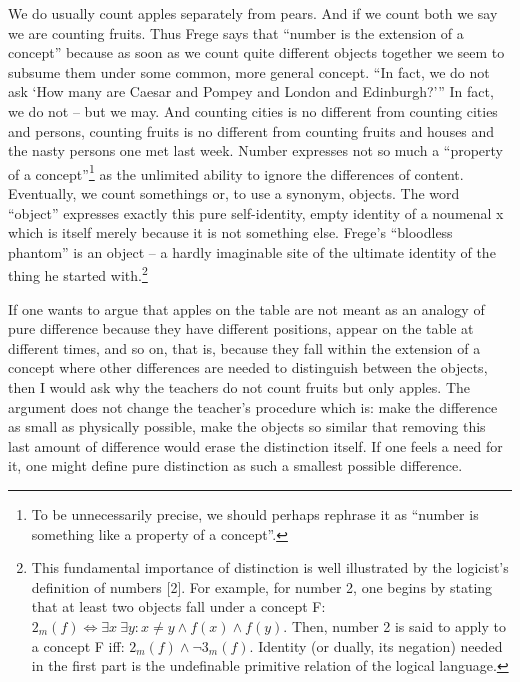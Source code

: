 We do usually count apples separately from pears. And if we count both we say we are counting fruits. Thus Frege says that ``number is the extension of a concept'' because as soon as we count quite different objects together we seem to subsume them under some common, more general concept. ``In fact, we do not ask `How many are Caesar and Pompey and London and Edinburgh?''' 
In fact, we do not -- but we may. And counting cities is no different from counting cities and persons, counting fruits is no different from counting fruits and houses and the nasty persons one met last week. 
Number expresses not so much a ``property of a concept''\footnote{To be 
unnecessarily  precise, we should perhaps rephrase it as ``number is 
something like a property of a concept''.} 
as the unlimited ability to ignore the differences of content. Eventually, 
we count somethings or, to use a synonym, objects. The word ``object'' expresses
 exactly this pure self-identity, empty identity of a noumenal x which is itself
 merely because it is not something else. Frege's ``bloodless phantom'' is an 
object -- a hardly imaginable site of the ultimate identity of the thing he 
started with.\footnote{This fundamental importance of distinction is well illustrated by the logicist's definition of numbers [2]. For example, for number 2, one begins by stating that at least two objects fall under a concept F: 
$2_m(f) \iff \exists x\ \exists y : x\not = y\land f(x)\land f(y)$. Then, 
number 2 is said to apply to a concept F iff: $2_m(f) \land \neg 3_m(f).$ Identity (or dually, its negation) needed in the first part is the undefinable primitive relation of the logical language.}

If one wants to argue that apples on the table are not meant as an analogy of pure difference because they have different positions, appear on the table at different times, and so on, that is, because they fall within the extension of a concept where other differences are needed to distinguish between the objects, then I would ask why the teachers do not count fruits but only apples. The argument does not change the teacher's procedure which is: make the difference as small as physically possible, make the objects so similar that removing this last amount of difference would erase the distinction itself. If one feels a need for it, one might define pure distinction as such a smallest possible difference. 

